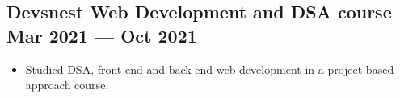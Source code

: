 \documentclass[a4,10pt]{article}
\newenvironment{zitemize}{
\begin{itemize}\itemsep0pt \parskip0pt \parsep1pt}
{\end{itemize}\vspace{-0.5cm}}
\begin{document}
    \subsection*{Devsnest Web Development and DSA course \hfill Mar 2021 --- Oct 2021}
\vspace{-0.05cm}
    \begin{zitemize}
    \item Studied DSA, front-end and back-end web development in a project-based
approach course.
    \end{zitemize}
\end{document}

